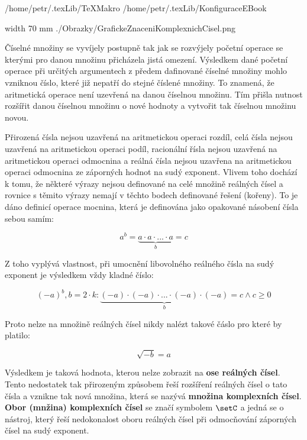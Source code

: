 \def\addr{/home/petr/.texLib}

 \addr/TeXMakro
\setAddress{\addr}
 \addr/KonfiguraceEBook


\pdfximage width 70 mm {./Obrazky/GrafickeZnaceniKomplexnichCisel.png}


\Obsah


Číselné množiny se vyvíjely postupně tak jak se rozvýjely početní operace se kterými pro danou množinu přicházela jistá omezení. Výsledkem dané početní operace při určitých argumentech z předem dafinované číselné množiny mohlo vzniknou číslo, které již nepatří do stejné číslené množiny. To znamená, že aritmetická operace není uzevřená na danou číselnou množinu. Tím přišla nutnost rozšířit danou číselnou množinu o nové hodnoty a vytvořit tak číselnou množinu novou. 

Přirozená čísla nejsou uzavřená na aritmetickou operaci rozdíl, celá čísla nejsou uzavřená na aritmetickou operaci podíl, racionální řísla nejsou uzavřená na aritmetickou operaci odmocnina a reálná čísla nejsou uzavřena na aritmetickou operaci odmocnina ze záporných hodnot na sudý exponent. Vlivem toho dochází k tomu, že některé výrazy nejsou definované na celé množině reálných čísel a rovnice s těmito výrazy nemají v těchto bodech definované řešení (kořeny). To je dáno definicí operace mocnina, která je definována jako opakované násobení čísla sebou samím:

$$ a^b = \underbrace{a\cdot a\cdot ... \cdot a}_b = c$$

Z toho vyplývá vlastnost, při umocnění libovolného reálného čísla na sudý exponent je výsledkem vždy kladné číslo:

$$ (-a)^{b}, b = 2\cdot k:  \underbrace{(-a) \cdot (-a) \cdot ... \cdot (-a) \cdot (-a)}_b = c \wedge c \ge 0 $$

Proto nelze na množině reálných čísel nikdy nalézt takové čáslo pro které by platilo:

$$ \sqrt{-b} = a $$


Výsledkem je taková hodnota, kterou nelze zobrazit na {\bf ose reálných čísel}. Tento nedostatek tak přirozeným způsobem řeší rozšíření reálných čísel o tato čísla a vznikne tak nová množina, která se nazývá {\bf množina komplexních čísel}. {\bf Obor (mnžina) komplexních čísel} se značí symbolem ${\setC}$ a jedná se o nástroj, který řeší nedokonalost oboru reálných čísel při odmocňování záporných čísel na sudý exponent. 

